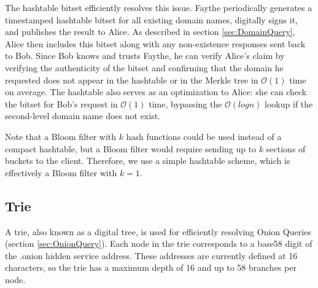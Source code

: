 The hashtable bitset efficiently resolves this issue. Faythe periodically generates a timestamped hashtable bitset for all existing domain names, digitally signs it, and publishes the result to Alice. As described in section \ref{sec:DomainQuery}, Alice then includes this bitset along with any non-existence responses sent back to Bob. Since Bob knows and trusts Faythe, he can verify Alice's claim by verifying the authenticity of the bitset and confirming that the domain he requested does not appear in the hashtable or in the Merkle tree in $ \mathcal{O}(1) $ time on average. The hashtable also serves as an optimization to Alice: she can check the bitset for Bob's request in $ \mathcal{O}(1) $ time, bypassing the $ \mathcal{O}(log n) $ lookup if the second-level domain name does not exist.

Note that a Bloom filter with $ k $ hash functions could be used instead of a compact hashtable, but a Bloom filter would require sending up to $ k $ sections of buckets to the client. Therefore, we use a simple hashtable scheme, which is effectively a Bloom filter with $ k = 1 $.




\subsection{Trie}

A trie, also known as a digital tree, is used for efficiently resolving Onion Queries (section \ref{sec:OnionQuery}). Each node in the trie corresponds to a base58 digit of the .onion hidden service address. These addresses are currently defined at 16 characters, so the trie has a maximum depth of 16 and up to 58 branches per node.

